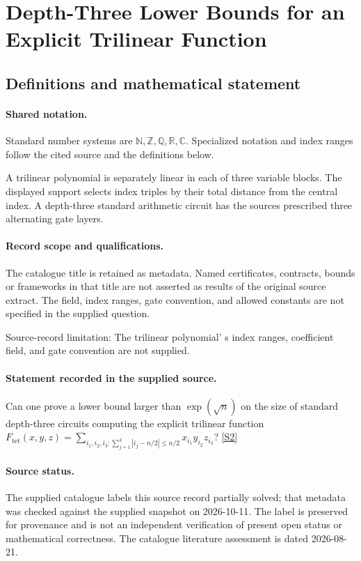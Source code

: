 \documentclass[11pt]{article}
\newcommand{\sref}[2]{\hyperlink{source:#1:#2}{[S#2]}}
\begin{document}
\section{Depth-Three Lower Bounds for an Explicit Trilinear Function}\label{statement}

\subsection{Definitions and mathematical statement}

\paragraph{Shared notation.}Standard number systems are $\mathbb N,\mathbb Z,\mathbb Q,\mathbb R,\mathbb C$. Specialized notation and index ranges follow the cited source and the definitions below.


A trilinear polynomial is separately linear in each of three variable blocks. The displayed support selects index triples by their total distance from the central index. A depth-three standard arithmetic circuit has the source\textquotesingle s prescribed three alternating gate layers.
\paragraph{Record scope and qualifications.}
The catalogue title is retained as metadata. Named certificates, contracts, bounds or frameworks in that title are not asserted as results of the original source extract.
The field, index ranges, gate convention, and allowed constants are not specified in the supplied question.

Source-record limitation: The trilinear polynomial' s index ranges, coefficient field, and gate convention are not supplied.
\paragraph{Statement recorded in the supplied source.}
Can one prove a lower bound larger than $\exp(\sqrt n)$ on the size of standard depth-three circuits computing the explicit trilinear function $F_{\mathrm{tet}}(x,y,z)=\sum_{i_1,i_2,i_3:\sum_{j=1}^3|i_j-n/2|\leq n/2}x_{i_1}y_{i_2}z_{i_3}$? \sref{statement}{2}
\paragraph{Source status.}
The supplied catalogue labels this source record partially solved; that metadata was checked against the supplied snapshot on 2026-10-11. The label is preserved for provenance and is not an independent verification of present open status or mathematical correctness. The catalogue literature assessment is dated 2026-08-21.
\end{document}
